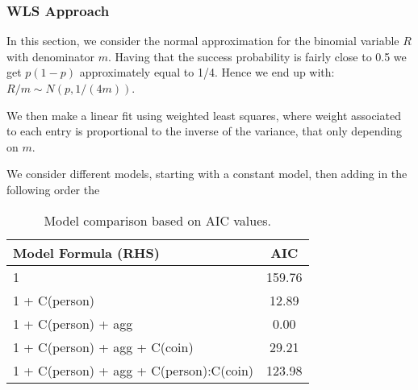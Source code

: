 \documentclass[a4paper, 12pt,oneside]{article}
\begin{document}
			\subsubsection{WLS Approach}
			In this section, we consider the normal approximation for the binomial variable $R$ with denominator $m$. Having that the success probability is fairly close to 0.5 we get $p(1-p)$ approximately equal to 1/4. Hence we end up with: $R/m \sim N(p,1/(4m))$. 

			We then make a linear fit using weighted least squares, where  weight associated to each entry is proportional to the inverse of the variance, that only depending on $m$.

			We consider different models, starting with a constant model, then adding in the following order the 

			\begin{table}[htb]
				\centering
				\caption{Model comparison based on AIC values.}
				\label{tab:model-comparison}
				\begin{tabular}{lc}
				\toprule
				Model Formula (RHS) & AIC \\
				\midrule
				1 & 159.76 \\
				1 + C(person) & 12.89 \\
				1 + C(person) + agg & 0.00 \\
				1 + C(person) + agg + C(coin) & 29.21 \\
				1 + C(person) + agg + C(person):C(coin) & 123.98 \\
				\bottomrule
				\end{tabular}
			\end{table}
\end{document}
